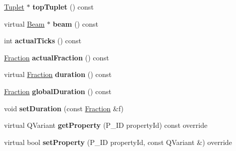\begin{DoxyCompactItemize}
\item 
\mbox{\label{class_ms_1_1_duration_element_abea2a39039bc10c4d7b1617f4eda5ba6}} 
\hyperlink{class_ms_1_1_tuplet}{Tuplet} $\ast$ {\bfseries top\+Tuplet} () const
\item 
\mbox{\label{class_ms_1_1_duration_element_a68d2ed8e330c66f884be82fd1a0565e6}} 
virtual \hyperlink{class_ms_1_1_beam}{Beam} $\ast$ {\bfseries beam} () const
\item 
\mbox{\label{class_ms_1_1_duration_element_abcc7393b3ff135add469d1ce63b36ac2}} 
int {\bfseries actual\+Ticks} () const
\item 
\mbox{\label{class_ms_1_1_duration_element_ac39d6224abb67d764c85c3ce2ab5fc78}} 
\hyperlink{class_ms_1_1_fraction}{Fraction} {\bfseries actual\+Fraction} () const
\item 
\mbox{\label{class_ms_1_1_duration_element_a569742f942b1ac8bda54f74903e766db}} 
virtual \hyperlink{class_ms_1_1_fraction}{Fraction} {\bfseries duration} () const
\item 
\mbox{\label{class_ms_1_1_duration_element_af73054e59a01ac8fd965cc69b84d35ca}} 
\hyperlink{class_ms_1_1_fraction}{Fraction} {\bfseries global\+Duration} () const
\item 
\mbox{\label{class_ms_1_1_duration_element_a4146a7c5ac356a918ee4cd47c7bc44f5}} 
void {\bfseries set\+Duration} (const \hyperlink{class_ms_1_1_fraction}{Fraction} \&f)
\item 
\mbox{\label{class_ms_1_1_duration_element_a9847f01e6fade1875d5506c6ac7b2158}} 
virtual Q\+Variant {\bfseries get\+Property} (P\+\_\+\+ID property\+Id) const override
\item 
\mbox{\label{class_ms_1_1_duration_element_aa8dd488396bb97fee73ce96d231194a2}} 
virtual bool {\bfseries set\+Property} (P\+\_\+\+ID property\+Id, const Q\+Variant \&) override
\end{DoxyCompactItemize}
